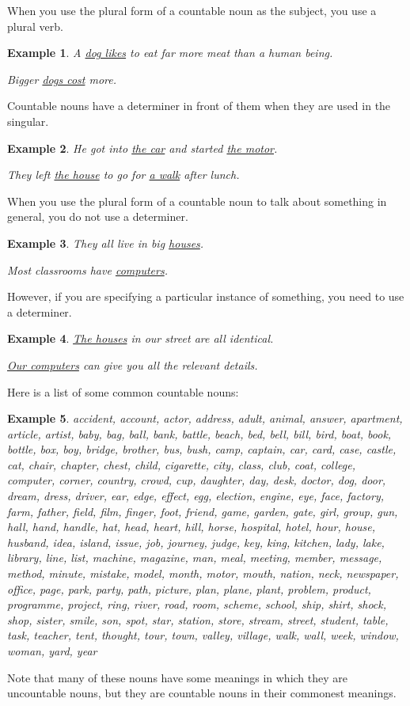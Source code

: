 \documentclass[oneside]{book}
\numberwithin{equation}{section}
\newtheorem{example}{Example}[section]
\begin{document}
When you use the plural form of a countable noun as the subject, you use a plural verb.
\begin{example}
    A \underline{dog likes} to eat far more meat than a human being.
    
    Bigger \underline{dogs cost} more.
\end{example}
%
\noindent{} Countable nouns have a determiner in front of them when they are used in the singular.
\begin{example}
    He got into \underline{the car} and started \underline{the motor}.
    
    They left \underline{the house} to go for \underline{a walk} after lunch.
\end{example}
When you use the plural form of a countable noun to talk about something in general, you do not use a determiner.
\begin{example}
    They all live in big \underline{houses}.
    
    Most classrooms have \underline{computers}.
\end{example}
However, if you are specifying a particular instance of something, you need to use a determiner.
\begin{example}
    \underline{The houses} in our street are all identical.
    
    \underline{Our computers} can give you all the relevant details.
\end{example}
%
\noindent{} Here is a list of some common countable nouns:
\begin{example}
    accident, account, actor, address, adult, animal, answer, apartment, article, artist, baby, bag, ball, bank, battle, beach, bed, bell, bill, bird, boat, book, bottle, box, boy, bridge, brother, bus, bush, camp, captain, car, card, case, castle, cat, chair, chapter, chest, child, cigarette, city, class, club, coat, college, computer, corner, country, crowd, cup, daughter, day, desk, doctor, dog, door, dream, dress, driver, ear, edge, effect, egg, election, engine, eye, face, factory, farm, father, field, film, finger, foot, friend, game, garden, gate, girl, group, gun, hall, hand, handle, hat, head, heart, hill, horse, hospital, hotel, hour, house, husband, idea, island, issue, job, journey, judge, key, king, kitchen, lady, lake, library, line, list, machine, magazine, man, meal, meeting, member, message, method, minute, mistake, model, month, motor, mouth, nation, neck, newspaper, office, page, park, party, path, picture, plan, plane, plant, problem, product, programme, project, ring, river, road, room, scheme, school, ship, shirt, shock, shop, sister, smile, son, spot, star, station, store, stream, street, student, table, task, teacher, tent, thought, tour, town, valley, village, walk, wall, week, window, woman, yard, year
\end{example}
Note that many of these nouns have some meanings in which they are uncountable nouns, but they are countable nouns in their commonest meanings.
\end{document}
